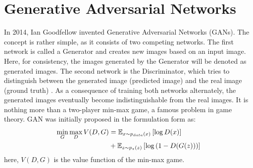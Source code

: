 \section{Generative Adversarial Networks}

In 2014, Ian Goodfellow invented Generative Adversarial Networks (GANs). The concept is rather simple, as it consists of two competing networks. The first network is called a Generator and creates new images based on an input image. Here, for consistency, the images generated by the Generator will be denoted as generated images. The second network is the Discriminator, which tries to distinguish between the generated image (predicted image) and the real image (ground truth) \cite{goodfellow2014generative}.
As a consequence of training both networks alternately, the generated images eventually become indistinguishable from the real images. It is nothing more than a two-player min-max game, a famous problem in game theory. GAN was initially proposed in the formulation form as:
\begin{equation}
	\centering
	\begin{aligned}
		\min_{G} \max_{D} V(D, G) &= \mathbb{E}_{x \sim p_{data}(x)} \left[ \log D(x) \right] \\
		&+ \mathbb{E}_{z \sim p_{z}(z)} \left[ \log \left( 1-D(G(z)) \right) \right]
	\end{aligned}
	\label{eq:Basic_GAN}
\end{equation}
here, $V(D, G)$ is the value function of the min-max game. 

